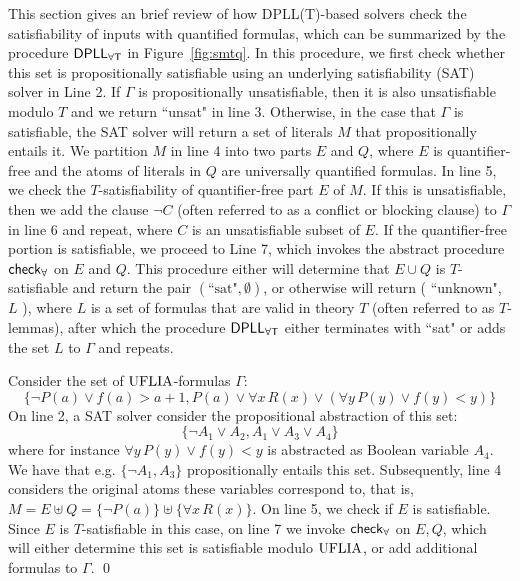 \documentclass[oribibl]{llncs}
\begin{document}
This section gives an brief review of how DPLL(T)-based solvers check the satisfiability of
inputs with quantified formulas, which can be summarized by the procedure $\small\mathsf{DPLL_{\forall T}}$ in Figure~\ref{fig:smtq}.
In this procedure, we first check whether this set is propositionally satisfiable using
an underlying satisfiability (SAT) solver in Line 2.
If $\Gamma$ is propositionally unsatisfiable,
then it is also unsatisfiable modulo $T$ and we return ``unsat" in line 3.
Otherwise, in the case that $\Gamma$ is satisfiable, the SAT solver will return a set of literals $M$ that propositionally entails it.
We partition $M$ in line 4 into two parts $E$ and $Q$,
where $E$ is quantifier-free and the atoms of literals in $Q$ are universally quantified formulas.
In line 5, we check the $T$-satisfiability of quantifier-free part $E$ of $M$.
If this is unsatisfiable, then we add the clause $\neg C$ (often referred to as a conflict or blocking clause) to $\Gamma$ in line 6 and repeat,
where $C$ is an unsatisfiable subset of $E$.
If the quantifier-free portion is satisfiable,
we proceed to Line 7, which invokes the abstract procedure $\small\mathsf{check}_\forall$ on $E$ and $Q$.
This procedure either will determine that $E \cup Q$ is $T$-satisfiable and return the pair $( \text{``sat"}, \emptyset )$,
or otherwise will return ( ``unknown", $L$ ), where $L$ is a set of formulas that are valid in theory $T$ (often referred to as $T$-lemmas),
after which the procedure $\small\mathsf{DPLL_{\forall T}}$ either terminates with ``sat" or adds the set $L$ to $\Gamma$ and repeats.
\begin{example}
Consider the set of $\mathrm{UFLIA}$-formulas $\Gamma$:
\[
\{ \neg P(a) \vee f(a)>a+1, P( a ) \vee \forall x\, R( x ) \vee (\forall y\, P(y) \vee f( y ) < y) \}
\]
On line 2, a SAT solver consider the propositional abstraction of this set:
\[
\{ \neg A_1 \vee A_2, A_1 \vee A_3 \vee A_4 \}
\]
where for instance $\forall y\, P(y) \vee f( y ) < y$ is abstracted as Boolean variable $A_4$.
We have that e.g. $\{ \neg A_1, A_3 \}$ propositionally entails this set.
Subsequently, line 4 considers the original atoms these variables correspond to, that is,
$M = E \uplus Q = \{ \neg P( a ) \} \uplus \{ \forall x\, R( x ) \}$.
On line 5, we check if $E$ is satisfiable.
Since $E$ is $T$-satisfiable in this case, on line 7
we invoke $\small\mathsf{check}_\forall$ on $E, Q$, which will either determine this set is
satisfiable modulo $\mathrm{UFLIA}$, or add additional formulas to $\Gamma$. 
\qed
\end{example}
\end{document}
